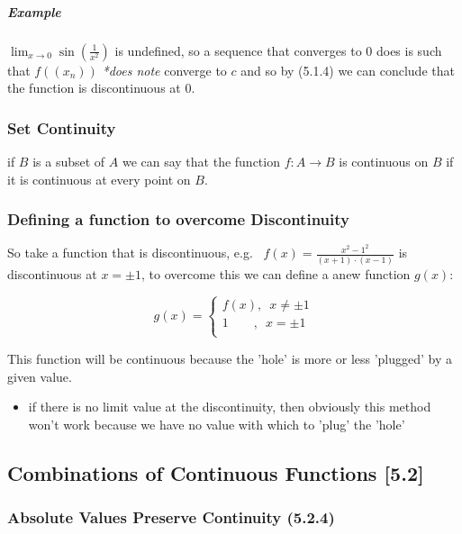 \documentclass[class=article, crop=false]{standalone}
\begin{document}
\hypertarget{header-n3932}{%
\subparagraph{Example}\label{header-n3932}}

\(\lim_{x\rightarrow 0} \sin(\frac{1}{x^2})\) is undefined, so a
sequence that converges to 0 does is such that
\(f\left(\left( x_n \right) \right)\) \emph{*does note} converge to
\(c\) and so by (5.1.4) we can conclude that the function is
discontinuous at 0.

\hypertarget{header-n3934}{%
\subsubsection{Set Continuity}\label{header-n3934}}

if \(B\) is a subset of \(A\) we can say that the function
\(f: A \rightarrow B \) is continuous on \(B\) if it is continuous at
every point on \(B\).

\hypertarget{header-n3936}{%
\subsubsection{Defining a function to overcome
Discontinuity}\label{header-n3936}}

So take a function that is discontinuous, e.g.
\(\enspace f(x) = \frac{x^2-1^2}{(x+1)\cdot (x-1)}\) is discontinuous at
\(x = \pm 1\), to overcome this we can define a anew function \(g(x)\):

\[g(x) = 
  \begin{cases}
    f\left( x \right) , \enspace
   x\neq \pm1\\ 
   1\quad \enspace \enspace  , \enspace   x = \pm 1\\
      \end{cases}\]

This function will be continuous because the 'hole' is more or less
'plugged' by a given value.

\begin{itemize}
\item
  if there is no limit value at the discontinuity, then obviously this
  method won't work because we have no value with which to 'plug' the
  'hole'
\end{itemize}

\hypertarget{header-n3943}{%
\subsection{Combinations of Continuous Functions
{[}5.2{]}}\label{header-n3943}}

\hypertarget{header-n3944}{%
\subsubsection{Absolute Values Preserve Continuity
(5.2.4)}\label{header-n3944}}
\end{document}
